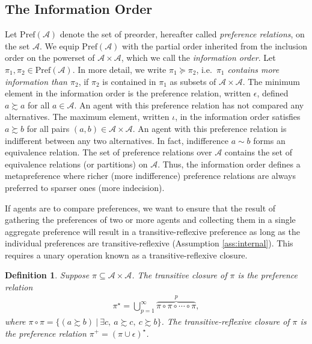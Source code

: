 \documentclass[conference]{ieeeconf}
\newcommand{\A}{\mathcal{A}}
\newcommand{\Pref}{\mathrm{Pref}}
\renewcommand{\L}{\mathcal{L}}
\newcommand{\prefers}{\succsim}
\DeclareMathOperator{\Atoms}{At}
\newtheorem{definition}{Definition}
\begin{document}


\subsection{The Information Order}

Let $\Pref(\A)$ denote the set of preorder, hereafter called \emph{preference relations}, on the set $\A$. We equip $\Pref(\A)$ with the partial order inherited from the inclusion order on the powerset of $\A \times \A$, which we call the \emph{information order}. Let $\pi_1, \pi_2 \in \Pref(\A)$. In more detail, we write $\pi_1 \succeq \pi_2$, i.e.~{\it $\pi_1$ contains more information than $\pi_2$}, if $\pi_2$ is contained in $\pi_1$ as subsets of $\A \times \A$. The minimum element in the information order is the preference relation, written $\epsilon$, defined $a \prefers a$ for all $a \in \A$. An agent with this preference relation has not compared any alternatives. The maximum element, written $\iota$, in the information order satisfies $a \prefers b$ for all pairs $(a,b) \in \A \times \A$. An agent with this preference relation is indifferent between any two alternatives. In fact, indifference $a \sim b$ forms an equivalence relation. The set of preference relations over $\A$ contains the set of equivalence relations (or partitions) on $\A$. Thus, the information order defines a metapreference where richer (more indifference) preference relations are always preferred to sparser ones (more indecision).

If agents are to compare preferences, we want to ensure that the result of gathering the preferences of two or more agents and collecting them in a single aggregate preference will result in a transitive-reflexive preference as long as the individual preferences are transitive-reflexive (Assumption \ref{ass:internal}). This requires a unary operation known as a transitive-reflexive closure.
\begin{definition}
    Suppose $\pi \subseteq \A \times \A$. The \emph{transitive closure} of $\pi$ is the preference relation 
\begin{align}
    \pi^{\star} = \bigcup_{p=1}^{\infty} \overbrace{\pi \circ \pi \circ \cdots \circ \pi}^{p}, \label{eq:transitive-closure}
\end{align}
where $\pi \circ \pi = \{ (a \prefers b)~\vert~\exists c,~a \prefers c,~c \prefers b\}$. The \emph{transitive-reflexive closure} of $\pi$ is the preference relation $\pi^{+} = \left( \pi \cup \epsilon \right)^\star$.
\end{definition}
\end{document}

